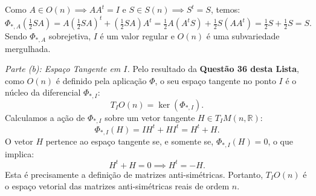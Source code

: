{	Como $A \in O(n) \implies AA^t = I$ e $S \in S(n) \implies S^t = S$, temos:
	\begin{equation*}
		\Phi_{*,A}(\tfrac{1}{2} SA) = A(\tfrac{1}{2} SA)^t + (\tfrac{1}{2} SA)A^t = \tfrac{1}{2} A(A^t S) + \tfrac{1}{2} S(AA^t) = \tfrac{1}{2} S + \tfrac{1}{2} S = S.
	\end{equation*}
	Sendo $\Phi_{*,A}$ sobrejetiva, $I$ é um valor regular e $O(n)$ é uma subvariedade mergulhada.
	
	\textit{Parte (b): Espaço Tangente em $I$.}
	Pelo resultado da \textbf{Questão 36 desta Lista}, como $O(n)$ é definido pela aplicação $\Phi$, o seu espaço tangente no ponto $I$ é o núcleo da diferencial $\Phi_{*,I}$:
	\begin{equation*}
		T_I O(n) = \ker(\Phi_{*,I}).
	\end{equation*}
	Calculamos a ação de $\Phi_{*,I}$ sobre um vetor tangente $H \in T_I M(n, \mathbb{R})$:
	\begin{equation*}
		\Phi_{*,I}(H) = IH^t + HI^t = H^t + H.
	\end{equation*}
	O vetor $H$ pertence ao espaço tangente se, e somente se, $\Phi_{*,I}(H) = 0$, o que implica:
	\begin{equation*}
		H^t + H = 0 \implies H^t = -H.
	\end{equation*}
	Esta é precisamente a definição de matrizes anti-simétricas. Portanto, $T_I O(n)$ é o espaço vetorial das matrizes anti-simétricas reais de ordem $n$.
}


